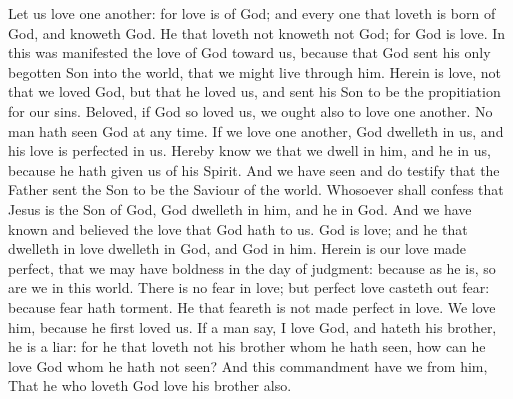  Let us love one another: for love is of God; and every one that loveth is born of God, and knoweth God. He that loveth not knoweth not God; for God is love. In this was manifested the love of God toward us, because that God sent his only begotten Son into the world, that we might live through him. Herein is love, not that we loved God, but that he loved us, and sent his Son to be the propitiation for our sins. Beloved, if God so loved us, we ought also to love one another. No man hath seen God at any time. If we love one another, God dwelleth in us, and his love is perfected in us. Hereby know we that we dwell in him, and he in us, because he hath given us of his Spirit. And we have seen and do testify that the Father sent the Son to be the Saviour of the world. Whosoever shall confess that Jesus is the Son of God, God dwelleth in him, and he in God. And we have known and believed the love that God hath to us. God is love; and he that dwelleth in love dwelleth in God, and God in him. Herein is our love made perfect, that we may have boldness in the day of judgment: because as he is, so are we in this world. There is no fear in love; but perfect love casteth out fear: because fear hath torment. He that feareth is not made perfect in love. We love him, because he first loved us. If a man say, I love God, and hateth his brother, he is a liar: for he that loveth not his brother whom he hath seen, how can he love God whom he hath not seen? And this commandment have we from him, That he who loveth God love his brother also.


